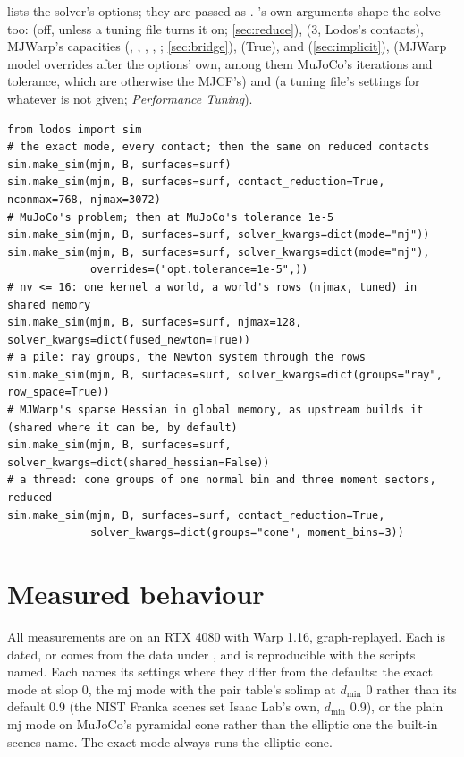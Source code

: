  lists the solver's options; they are passed as . 's own arguments shape the solve too:  (off, unless a tuning file turns it on; \cref{sec:reduce}),  (3, Lodos's contacts), MJWarp's capacities (, , , , ; \cref{sec:bridge}),  (True),  and  (\cref{sec:implicit}),  (MJWarp model overrides after the options' own, among them MuJoCo's iterations and tolerance, which are otherwise the MJCF's) and  (a tuning file's settings for whatever is not given; \emph{Performance Tuning}).

\begin{lstlisting}
from lodos import sim
# the exact mode, every contact; then the same on reduced contacts
sim.make_sim(mjm, B, surfaces=surf)
sim.make_sim(mjm, B, surfaces=surf, contact_reduction=True, nconmax=768, njmax=3072)
# MuJoCo's problem; then at MuJoCo's tolerance 1e-5
sim.make_sim(mjm, B, surfaces=surf, solver_kwargs=dict(mode="mj"))
sim.make_sim(mjm, B, surfaces=surf, solver_kwargs=dict(mode="mj"),
             overrides=("opt.tolerance=1e-5",))
# nv <= 16: one kernel a world, a world's rows (njmax, tuned) in shared memory
sim.make_sim(mjm, B, surfaces=surf, njmax=128, solver_kwargs=dict(fused_newton=True))
# a pile: ray groups, the Newton system through the rows
sim.make_sim(mjm, B, surfaces=surf, solver_kwargs=dict(groups="ray", row_space=True))
# MJWarp's sparse Hessian in global memory, as upstream builds it (shared where it can be, by default)
sim.make_sim(mjm, B, surfaces=surf, solver_kwargs=dict(shared_hessian=False))
# a thread: cone groups of one normal bin and three moment sectors, reduced
sim.make_sim(mjm, B, surfaces=surf, contact_reduction=True,
             solver_kwargs=dict(groups="cone", moment_bins=3))
\end{lstlisting}

\section{Measured behaviour}\label{sec:measured}

All measurements are on an RTX 4080 with Warp 1.16, graph-replayed. Each is dated, or comes from the data under , and is reproducible with the scripts named. Each names its settings where they differ from the defaults: the exact mode at slop 0, the mj mode with the pair table's solimp at $d_{\min}$ 0 rather than its default 0.9 (the NIST Franka scenes set Isaac Lab's own, $d_{\min}$ 0.9), or the plain mj mode on MuJoCo's pyramidal cone rather than the elliptic one the built-in scenes name. The exact mode always runs the elliptic cone.

